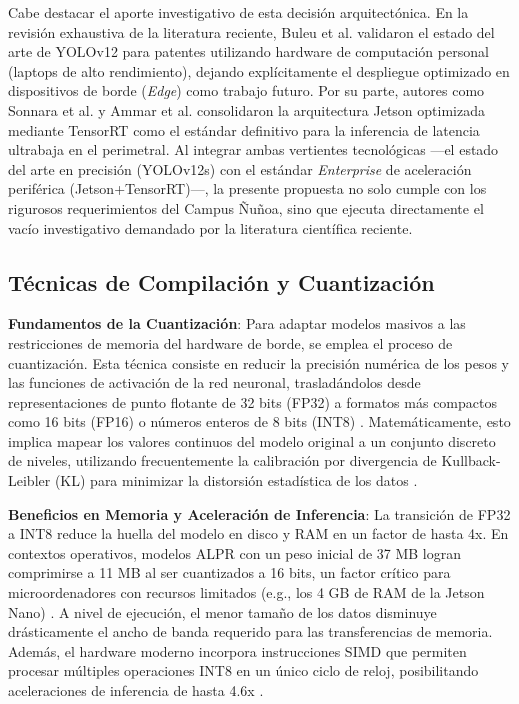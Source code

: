 Cabe destacar el aporte investigativo de esta decisión arquitectónica. En la revisión exhaustiva de la literatura reciente, Buleu et al. \parencite{buleuDeepLearningBasedSystem2025a} validaron el estado del arte de YOLOv12 para patentes utilizando hardware de computación personal (laptops de alto rendimiento), dejando explícitamente el despliegue optimizado en dispositivos de borde (\textit{Edge}) como trabajo futuro. Por su parte, autores como Sonnara et al. \parencite{sonnaraEfficientRealtimeLicense2025} y Ammar et al. \parencite{ammarMultiStageDeepLearningBasedVehicle2023} consolidaron la arquitectura Jetson optimizada mediante TensorRT como el estándar definitivo para la inferencia de latencia ultrabaja en el perimetral. Al integrar ambas vertientes tecnológicas ---el estado del arte en precisión (YOLOv12s) con el estándar \textit{Enterprise} de aceleración periférica (Jetson+TensorRT)---, la presente propuesta no solo cumple con los rigurosos requerimientos del Campus Ñuñoa, sino que ejecuta directamente el vacío investigativo demandado por la literatura científica reciente.

\subsection{Técnicas de Compilación y Cuantización}

\textbf{Fundamentos de la Cuantización}: 
Para adaptar modelos masivos a las restricciones de memoria del hardware de borde, se 
emplea el proceso de cuantización. Esta técnica consiste en reducir la precisión numérica 
de los pesos y las funciones de activación de la red neuronal, trasladándolos desde 
representaciones de punto flotante de 32 bits (FP32) a formatos más compactos como 16 bits 
(FP16) o números enteros de 8 bits (INT8) 
\parencite{sonnaraEfficientRealtimeLicense2025, swatiEfficientDeepLearning2024}. 
Matemáticamente, esto implica mapear los valores continuos del modelo original a un 
conjunto discreto de niveles, utilizando frecuentemente la calibración por divergencia 
de Kullback-Leibler (KL) para minimizar la distorsión estadística de los datos 
\parencite{ammarMultiStageDeepLearningBasedVehicle2023}.

\textbf{Beneficios en Memoria y Aceleración de Inferencia}: 
La transición de FP32 a INT8 reduce la huella del modelo en disco y RAM en un factor 
de hasta 4x. En contextos operativos, modelos ALPR con un peso inicial de 37 MB logran 
comprimirse a 11 MB al ser cuantizados a 16 bits, un factor crítico para microordenadores 
con recursos limitados (e.g., los 4 GB de RAM de la Jetson Nano) 
\parencite{sonnaraEfficientRealtimeLicense2025, swatiEfficientDeepLearning2024}. 
A nivel de ejecución, el menor tamaño de los datos disminuye drásticamente el ancho de 
banda requerido para las transferencias de memoria. Además, el hardware moderno incorpora 
instrucciones SIMD que permiten procesar múltiples operaciones INT8 en un único ciclo de 
reloj, posibilitando aceleraciones de inferencia de hasta 4.6x 
\parencite{ammarMultiStageDeepLearningBasedVehicle2023, sonnaraEfficientRealtimeLicense2025}.

